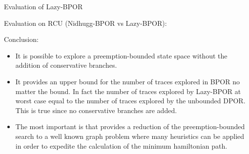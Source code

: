 \documentclass[9pt]{beamer}
\newcommand{\bigtabular}[2]{
 \begin{table} 
   \resizebox{\linewidth}{!}{
      
    }
    \caption{#2}
    \label{#2}
 \end{table}
}
\newtheorem{lem}[thm]{Λήμμα}
\begin{document}
\begin{frame}{Evaluation of Lazy-BPOR}

Evaluation on RCU (Nidhugg-BPOR vs Lazy-BPOR):
\bigtabular{"../tables/hline_pandas_lazy_preep.tex"}{Comparison between BPOR and Lazy-BPOR}

\end{frame}

\begin{frame}
Conclusion:

\begin{itemize}
    \item It is possible to explore a preemption-bounded state space without the addition of conservative branches.
    \item It provides an upper bound for the number of traces explored in BPOR no matter the bound. In fact the number
    of traces explored by Lazy-BPOR at worst case equal to the number of traces explored by the unbounded DPOR. This is
    true since no conservative branches are added.
    \item The most important is that provides a reduction of the preemption-bounded search to a well known graph problem where many heuristics can
    be applied in order to expedite the calculation of the minimum hamiltonian path.
\end{itemize}
    
\end{frame}

\iffalse
\begin{frame}
    \begin{lem}
        aajldfkj        
    \end{lem}

    \begin{proof}
        από το Μ αν αντικαταστήσουμε ένα redex με το contractum του και το 
        N' προκύπτει από το Μ' αν αντικαταστήσουμε το αντίστοιχο redex με το 
        contractum του. Το ζητούμενο προκύπτει από τη μεταβατικότητα της σχέσης.
    \end{proof}    
\end{frame}
\fi

\begin{frame}

\end{frame}



\end{document}
